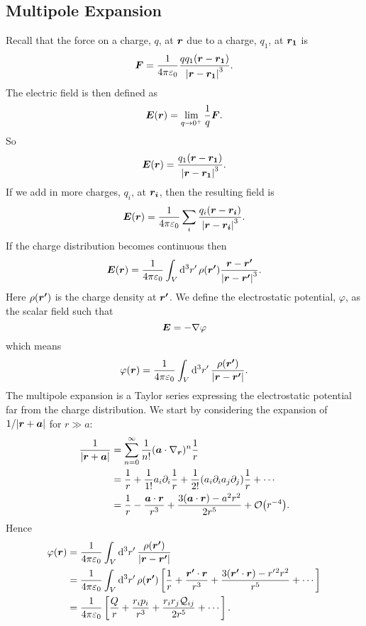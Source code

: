 \subsection{Multipole Expansion}
Recall that the force on a charge, \(q\), at \(\bm{r}\) due to a charge, \(q_1\), at \(\bm{r_1}\) is
\[\bm{F} = \frac{1}{4\pi\varepsilon_0} \frac{qq_1(\bm{r} - \bm{r_1})}{\abs{\bm{r} - \bm{r_1}}^3}.\]
The electric field is then defined as
\[\bm{E}(\bm{r}) = \lim_{q\to 0^+} \frac{1}{q}\bm{F}.\]
So
\[\bm{E}(\bm{r}) = \frac{q_1(\bm{r} - \bm{r_1})}{\abs{\bm{r} - \bm{r_1}}^3}.\]
If we add in more charges, \(q_i\), at \(\bm{r_i}\), then the resulting field is
\[\bm{E}(\bm{r}) = \frac{1}{4\pi\varepsilon_0} \sum_i \frac{q_i(\bm{r} - \bm{r_i})}{\abs{\bm{r} - \bm{r_i}}^3}.\]
If the charge distribution becomes continuous then
\[\bm{E}(\bm{r}) = \frac{1}{4\pi\varepsilon_0} \int_V\dd[3]{r'} \rho(\bm{r'}) \frac{\bm{r} - \bm{r'}}{\abs{\bm{r} - \bm{r'}}^3}.\]
Here \(\rho(\bm{r'})\) is the charge density at \(\bm{r'}\).
We define the electrostatic potential, \(\varphi\), as the scalar field such that
\[\bm{E} = -\nabla\varphi\]
which means
\[\varphi(\bm{r}) = \frac{1}{4\pi\varepsilon_0}\int_V \dd[3]{r'} \frac{\rho(\bm{r'})}{\abs{\bm{r} - \bm{r'}}}.\]
The multipole expansion is a Taylor series expressing the electrostatic potential far from the charge distribution.
We start by considering the expansion of \(1/\abs{\bm{r} + \bm{a}}\) for \(r \gg a\):
\begin{align*}
    \frac{1}{\abs{\vv{r} + \vv{a}}} &= \sum_{n=0}^{\infty} \frac{1}{n!} (\vv{a} \cdot \grad_{\vv{r}})^n \frac{1}{r}\\
    &= \frac{1}{r} + \frac{1}{1!}a_i\partial_i\frac{1}{r} + \frac{1}{2!}(a_i\partial_ia_j\partial_j) \frac{1}{r} + \dotsb\\
    &= \frac{1}{r} - \frac{\vv{a}\cdot\vv{r}}{r^3} + \frac{3(\vv{a}\cdot\vv{r}) - a^2r^2}{2r^5} + \order{r^{-4}}.
\end{align*}
Hence
\begin{align*}
    \varphi(\bm{r}) &= \frac{1}{4\pi\varepsilon_0} \int_V \dd[3]{r'} \frac{\rho(\bm{r'})}{\abs{\bm{r} - \bm{r'}}}\\
    &= \frac{1}{4\pi\varepsilon_0} \int_V \dd[3]{r'} \rho(\bm{r'})\left[ \frac{1}{r} + \frac{\bm{r'}\cdot\bm{r}}{r^3} + \frac{3(\bm{r'}\cdot\bm{r}) - r'{^2}r^2}{r^5} + \dotsb \right]\\
    &= \frac{1}{4\pi\varepsilon_0} \left[\frac{Q}{r} + \frac{r_ip_i}{r^3} + \frac{r_ir_j\mathcal{Q}_{ij}}{2r^5} + \dotsb\right].
\end{align*}
